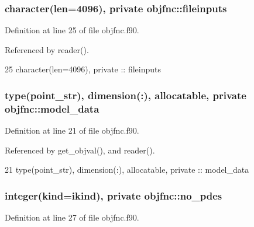 \subsubsection[{fileinputs}]{\setlength{\rightskip}{0pt plus 5cm}character(len=4096), private objfnc\+::fileinputs\hspace{0.3cm}{\ttfamily [private]}}\label{namespaceobjfnc_a31eae2b00085eccaad9921c4b95e2c84}


Definition at line 25 of file objfnc.\+f90.



Referenced by reader().


\begin{DoxyCode}
25   \textcolor{keywordtype}{character(len=4096)}, \textcolor{keywordtype}{private} :: fileinputs
\end{DoxyCode}
\subsubsection[{model\+\_\+data}]{\setlength{\rightskip}{0pt plus 5cm}type({\bf point\+\_\+str}), dimension(\+:), allocatable, private objfnc\+::model\+\_\+data\hspace{0.3cm}{\ttfamily [private]}}\label{namespaceobjfnc_a57dd49eaed017851cdf03a28bcd5cd58}


Definition at line 21 of file objfnc.\+f90.



Referenced by get\+\_\+objval(), and reader().


\begin{DoxyCode}
21   \textcolor{keywordtype}{type}(point\_str), \textcolor{keywordtype}{dimension(:)}, \textcolor{keywordtype}{allocatable}, \textcolor{keywordtype}{private} :: model\_data
\end{DoxyCode}
\subsubsection[{no\+\_\+pdes}]{\setlength{\rightskip}{0pt plus 5cm}integer(kind=ikind), private objfnc\+::no\+\_\+pdes\hspace{0.3cm}{\ttfamily [private]}}\label{namespaceobjfnc_ab31bdc49001762f0764208f8be4d058b}


Definition at line 27 of file objfnc.\+f90.



